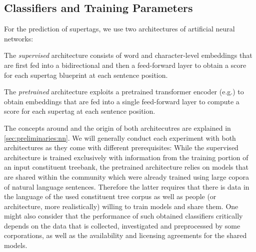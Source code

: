 \documentclass[../../document.tex]{subfiles}
\begin{document}
    \subsection{Classifiers and Training Parameters}
    For the prediction of supertags, we use two architectures of artificial neural networks:
    \begin{compactitem}
        \item The \emph{supervised} architecture consists of word and character-level embeddings that are first fed into a bidirectional  and then a feed-forward layer to obtain a score for each supertag blueprint at each sentence position.
        \item The \emph{pretrained} architecture exploits a pretrained transformer encoder (e.g.\@ {}) to obtain embeddings that are fed into a single feed-forward layer to compute a score for each supertag at each sentence position.
    \end{compactitem}
    The concepts around and the origin of both architecutres are explained in \cref{sec:preliminaries:nn}.
    We will generally conduct each experiment with both architectures as they come with different prerequisites:
        While the supervised architecture is trained exclusively with information from the training portion of an input constituent treebank, the pretrained architecture relies on models that are shared within the  community which were already trained using large copora of natural language sentences.
        Therefore the latter requires that there is data in the language of the used constituent tree corpus as well as people (or architecture, more realistically) willing to train models and share them.
        One might also consider that the performance of such obtained classifiers critically depends on the data that is collected, investigated and preprocessed by some corporations, as well as the availability and licensing agreements for the shared models.
    
\end{document}
